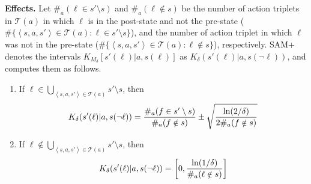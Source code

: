 \documentclass[letterpaper]{article} %
\newcommand{\tuple}[1]{\ensuremath{\left \langle #1 \right \rangle }}
\begin{document}
\noindent \textbf{Effects.} 
Let $\#_a(\ell\in s'\setminus s)$ and $\#_a(\ell\notin s)$ 
be the number of action triplets in $\mathcal{T}(a)$ in which $\ell$ is in the post-state and not the pre-state ($\#\{\tuple{s, a, s'}\in \mathcal{T}(a):\ell\in s'\setminus s\}$), 
and the number of action triplet in which $\ell$ was not in the pre-state 
($\#\{\tuple{s, a, s'}\in \mathcal{T}(a):\ell\notin s\}$), respectively. 
SAM+ denotes the intervals $K_{M_\delta}[s'(\ell)|a,s(\ell)]$ 
as $K_\delta(s'(\ell)|a,s(\neg \ell))$, and computes them as follows.
\begin{enumerate}
    \item If $\ell \in \bigcup_{\tuple{s, a, s'}\in \mathcal{T}(a)} s'\setminus s$, 
then 
\begin{equation}
\small
    K_\delta(s'(\ell)|a,s(\neg \ell)) = \frac{\#_a(f\in s'\setminus s)}{\#_a(f\notin s)} \pm\sqrt{\frac{\ln(2/\delta)}{2\#_a(f\notin s)}}
    \label{eq:present-effects}
\end{equation}
\item If $\ell\notin\bigcup_{\tuple{s, a, s'}\in \mathcal{T}(a)} s'\setminus s$, then 
\begin{equation}
\small
    K_\delta(s'(\ell)|a,s(\neg \ell)) = \left[0,\frac{\ln(1/\delta)}{\#_a(\ell\notin s)}\right]
    \label{eq:missing-effects}
\end{equation}
\end{enumerate}



\end{document}
